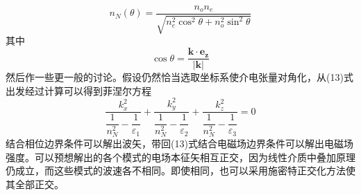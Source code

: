\documentclass[12pt, a4paper, oneside]{ctexart}
\begin{document}
	\begin{equation}
		n_{N}(\theta)=\dfrac{n_{o}n_{e}}{\sqrt{n_{e}^{2}\cos^{2}\theta+n_{o}^{2}\sin^{2}\theta}}
	\end{equation}
	\quad\quad 其中
	\begin{equation}
		\cos\theta=\dfrac{\boldsymbol{k}\cdot\boldsymbol{e_{z}}}{|\boldsymbol{k}|}
	\end{equation}
	\quad\quad 然后作一些更一般的讨论。假设仍然恰当选取坐标系使介电张量对角化，从(13)式出发经过计算可以得到菲涅尔方程
	\begin{equation}
		\dfrac{k_{x}^{2}}{\dfrac{1}{n_{N}^{2}}-\dfrac{1}{\varepsilon_{1}}}+\dfrac{k_{y}^{2}}{\dfrac{1}{n_{N}^{2}}-\dfrac{1}{\varepsilon_{2}}}+\dfrac{k_{z}^{2}}{\dfrac{1}{n_{N}^{2}}-\dfrac{1}{\varepsilon_{3}}}=0
	\end{equation}
	\quad\quad 结合相位边界条件可以解出波矢，带回(13)式结合电磁场边界条件可以解出电磁场强度。可以预想解出的各个模式的电场本征矢相互正交，因为线性介质中叠加原理仍成立，而这些模式的波速各不相同。即使相同，也可以采用施密特正交化方法使其全部正交。
\end{document}
